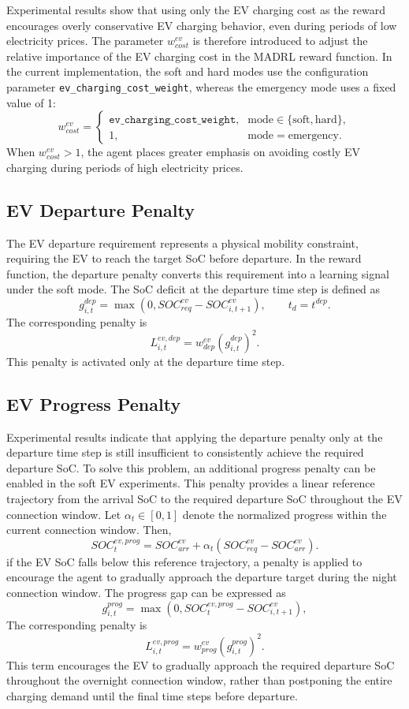 Experimental results show that using only the EV charging cost as the reward encourages overly conservative EV charging behavior, even during periods of low electricity prices. The parameter \(w^{ev}_{cost}\) is therefore introduced to adjust the relative importance of the EV charging cost in the MADRL reward function. In the current implementation, the soft and hard modes use the configuration parameter \texttt{ev\_charging\_cost\_weight}, whereas the emergency mode uses a fixed value of 1:
\[
w^{ev}_{cost}=
\left\{
\begin{array}{ll}
\texttt{ev\_charging\_cost\_weight}, & \mathrm{mode}\in\{\mathrm{soft},\mathrm{hard}\},\\
1, & \mathrm{mode}=\mathrm{emergency}.
\end{array}
\right.
\]
When \(w^{ev}_{cost}>1\), the agent places greater emphasis on avoiding costly EV charging during periods of high electricity prices. 

\subsection{EV Departure Penalty}

The EV departure requirement represents a physical mobility constraint, requiring the EV to reach the target SoC before departure. In the reward function, the departure penalty converts this requirement into a learning signal under the soft mode. The SoC deficit at the departure time step is defined as
\[
  g^{dep}_{i,t}
  =
  \max(0,SOC^{ev}_{req}-SOC^{ev}_{i,t+1}),
  \qquad t_d=t^{dep}.
\]
The corresponding penalty is
\[
  L^{ev,dep}_{i,t}
  =
  w^{ev}_{dep}(g^{dep}_{i,t})^2.
\]
This penalty is activated only at the departure time step. 

\subsection{EV Progress Penalty}

Experimental results indicate that applying the departure penalty only at the departure time step is still insufficient to consistently achieve the required departure SoC. To solve this problem, an additional progress penalty can be enabled in the soft EV experiments. This penalty provides a linear reference trajectory from the arrival SoC to the required departure SoC throughout the EV connection window. Let \(\alpha_t\in[0,1]\) denote the normalized progress within the current connection window. Then,
\[
  SOC^{ev,prog}_{t}
  =
  SOC^{ev}_{arr}
  +
  \alpha_t(SOC^{ev}_{req}-SOC^{ev}_{arr}).
\]
if the EV SoC falls below this reference trajectory, a penalty is applied to encourage the agent to gradually approach the departure target during the night connection window. The progress gap can be expressed as
\[
  g^{prog}_{i,t}
  =
  \max(0,SOC^{ev,prog}_{t}-SOC^{ev}_{i,t+1}),
\]
The corresponding penalty is
\[
  L^{ev,prog}_{i,t}
  =
  w^{ev}_{prog}(g^{prog}_{i,t})^2.
\]
This term encourages the EV to gradually approach the required departure SoC throughout the overnight connection window, rather than postponing the entire charging demand until the final time steps before departure.

